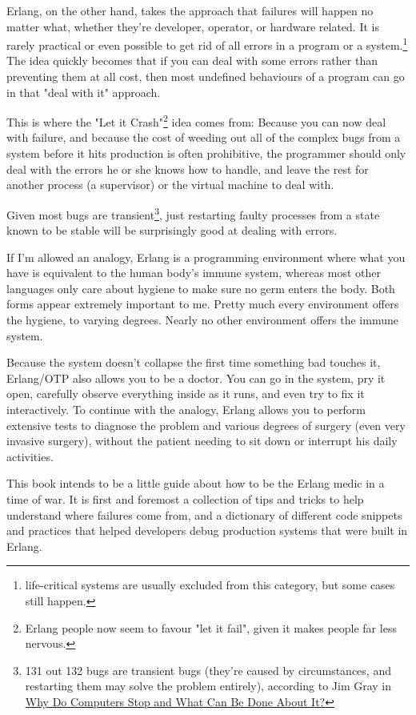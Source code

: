 \documentclass[11pt, oneside]{book}   	%
\begin{document}
Erlang, on the other hand, takes the approach that failures will happen no matter what, whether they're developer, operator, or hardware related. It is rarely practical or even possible to get rid of all errors in a program or a system.\footnote{life-critical systems are usually excluded from this category, but some cases still happen.} The idea quickly becomes that if you can deal with some errors rather than preventing them at all cost, then most undefined behaviours of a program can go in that "deal with it" approach.

This is where the "Let it Crash"\footnote{Erlang people now seem to favour "let it fail", given it makes people far less nervous.} idea comes from: Because you can now deal with failure, and because the cost of weeding out all of the complex bugs from a system before it hits production is often prohibitive, the programmer should only deal with the errors he or she knows how to handle, and leave the rest for another process (a supervisor) or the virtual machine to deal with.

Given most bugs are transient\footnote{131 out 132 bugs are transient bugs (they're caused by circumstances, and restarting them may solve the problem entirely), according to Jim Gray in \href{http://www.hpl.hp.com/techreports/tandem/TR-85.7.html}{Why Do Computers Stop and What Can Be Done About It?}}, just restarting faulty processes from a state known to be stable will be surprisingly good at dealing with errors.

If I'm allowed an analogy, Erlang is a programming environment where what you have is equivalent to the human body's immune system, whereas most other languages only care about hygiene to make sure no germ enters the body. Both forms appear extremely important to me. Pretty much every environment offers the hygiene, to varying degrees. Nearly no other environment offers the immune system.

Because the system doesn't collapse the first time something bad touches it, Erlang/OTP also allows you to be a doctor. You can go in the system, pry it open, carefully observe everything inside as it runs, and even try to fix it interactively. To continue with the analogy, Erlang allows you to perform extensive tests to diagnose the problem and various degrees of surgery (even very invasive surgery), without the patient needing to sit down or interrupt his daily activities.

This book intends to be a little guide about how to be the Erlang medic in a time of war. It is first and foremost a collection of tips and tricks to help understand where failures come from, and a dictionary of different code snippets and practices that helped developers debug production systems that were built in Erlang.
\end{document}
